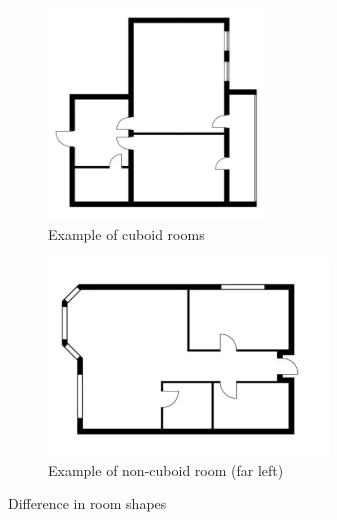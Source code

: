 \begin{figure}[htbp]
    \centering
    \begin{subfigure}[b]{0.38\textwidth}
        \centering
        \includegraphics[width=\textwidth]{images/cuboidfloorplan.png}
        \caption{Example of cuboid rooms}
        \label{fig:cuboidroom}
    \end{subfigure}
    \hfill
    \begin{subfigure}[b]{0.38\textwidth}
        \centering
        \includegraphics[width=\textwidth]{images/noncuboidfloorplan.png}
        \caption{Example of non-cuboid room (far left)}
        \label{fig:noncuboidroom}
    \end{subfigure}
    \caption{Difference in room shapes}
    \label{fig:bothfigures}
\end{figure}

